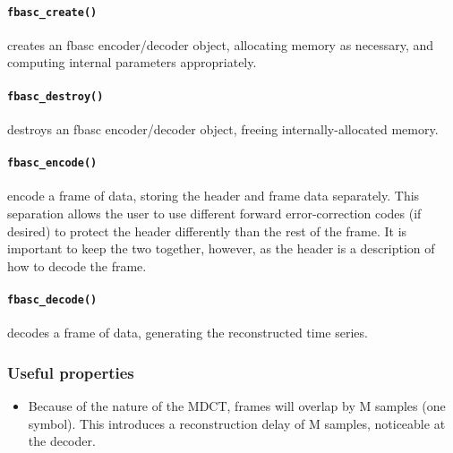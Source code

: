 \paragraph{{\tt fbasc\_create()}}
        creates an fbasc encoder/decoder object, allocating memory as
        necessary, and computing internal parameters appropriately.
\paragraph{{\tt fbasc\_destroy()}}
        destroys an fbasc encoder/decoder object, freeing internally-allocated
        memory.
\paragraph{{\tt fbasc\_encode()}}
        encode a frame of data, storing the header and frame data separately.
        This separation allows the user to use different forward
        error-correction codes (if desired) to protect the header differently
        than the rest of the frame.  It is important to keep the two together,
        however, as the header is a description of how to decode the frame.
\paragraph{{\tt fbasc\_decode()}}
        decodes a frame of data, generating the reconstructed time series.

\subsubsection{Useful properties}
\begin{itemize}
\item Because of the nature of the MDCT, frames will overlap by M samples
      (one symbol).  This introduces a reconstruction delay of M samples,
      noticeable at the decoder.
\end{itemize}

%
%
%
%

